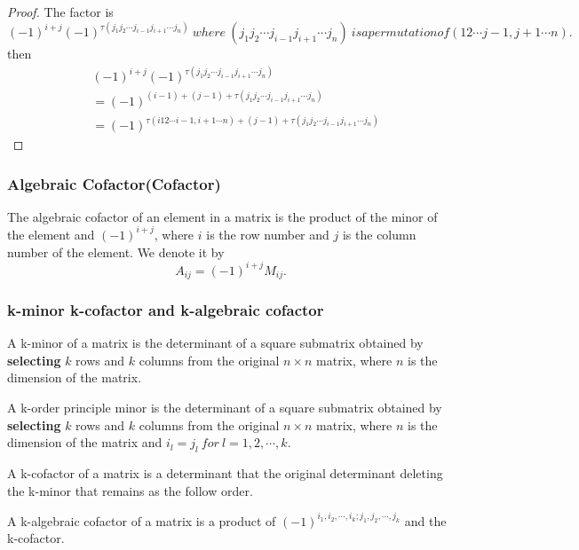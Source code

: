 \documentclass{article}
\theoremstyle{definition}
\begin{document}
\begin{proof}
    The factor is 
    $$(-1)^{i+j}(-1)^{\tau (j_{1}j_{2}\cdots j_{i-1}j_{i+1}\cdots j_{n})}\ where\ (j_{1}j_{2}\cdots j_{i-1}j_{i+1}\cdots j_{n})\ is a permutation of 
    (12\cdots j-1,j+1\cdots n).$$
    then 
    \begin{align*}
        &(-1)^{i+j}(-1)^{\tau(j_{1}j_{2}\cdots j_{i-1}j_{i+1}\cdots j_{n})}\\
        &=(-1)^{(i-1)+(j-1)+\tau(j_{1}j_{2}\cdots j_{i-1}j_{i+1}\cdots j_{n})}\\
        &=(-1)^{\tau(i12\cdots i-1,i+1\cdots n)+(j-1)+\tau(j_{1}j_{2}\cdots j_{i-1}j_{i+1}\cdots j_{n})}
    \end{align*}
    
\end{proof}





\subsubsection{Algebraic Cofactor(Cofactor)}
The algebraic cofactor of an element in a matrix is the product of the minor of the element and 
$(-1)^{i+j}$, where $i$ is the row number and $j$ is the column number of the element. 
We denote it by 
$$A_{ij}=(-1)^{i+j}M_{ij}.$$
\subsubsection{k-minor  k-cofactor and k-algebraic cofactor}

A k-minor of a matrix is the determinant of a 
square submatrix obtained by \textbf{selecting} $k$ 
rows and $k$ columns from the original $n×n$ 
matrix, where $n$ is the dimension of the matrix.

A k-order principle minor is the determinant of a 
square submatrix obtained by \textbf{selecting} $k$
rows and $k$ columns from the original $n×n$
matrix, where $n$ is the dimension of the matrix and 
$i_{l}=j_{l}\ for\ l=1,2,\cdots,k$. 



A k-cofactor of a matrix is a determinant that the original determinant deleting the 
k-minor that remains as the follow order.

A k-algebraic cofactor of a matrix is a product of $(-1)^{i_{1},i_{2},\cdots,i_{k};j_{1},j_{2},\cdots,j_{k}}$
 and the k-cofactor.
\end{document}
